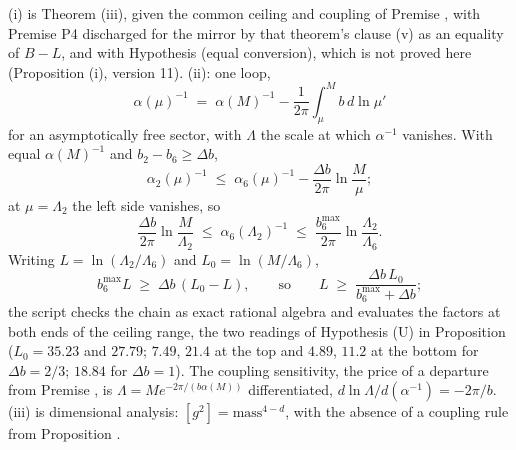 (i) is Theorem (iii), given the common ceiling and coupling of Premise , with Premise P4 discharged for the mirror by that theorem's clause (v) as an equality of $B - L$, and with Hypothesis (equal conversion), which is not proved here (Proposition (i), version 11). (ii): one loop,
\[
\alpha(\mu)^{-1} \;=\; \alpha(M)^{-1} - \frac{1}{2\pi}\int_{\mu}^{M} b\,d\ln\mu'
\]
for an asymptotically free sector, with $\Lambda$ the scale at which $\alpha^{-1}$ vanishes. With equal $\alpha(M)^{-1}$ and $b_{2} - b_{6} \geq \Delta b$,
\[
\alpha_{2}(\mu)^{-1} \;\leq\; \alpha_{6}(\mu)^{-1} - \frac{\Delta b}{2\pi}\ln\frac{M}{\mu};
\]
at $\mu = \Lambda_{2}$ the left side vanishes, so
\[
\frac{\Delta b}{2\pi}\ln\frac{M}{\Lambda_{2}} \;\leq\; \alpha_{6}(\Lambda_{2})^{-1} \;\leq\; \frac{b_{6}^{\max}}{2\pi}\ln\frac{\Lambda_{2}}{\Lambda_{6}}.
\]
Writing $L = \ln(\Lambda_{2}/\Lambda_{6})$ and $L_{0} = \ln(M/\Lambda_{6})$,
\[
b_{6}^{\max}L \;\geq\; \Delta b\,(L_{0} - L), \qquad\text{so}\qquad L \;\geq\; \frac{\Delta b\,L_{0}}{b_{6}^{\max} + \Delta b};
\]
the script checks the chain as exact rational algebra and evaluates the factors at both ends of the ceiling range, the two readings of Hypothesis (U) in Proposition  ($L_{0} = 35.23$ and $27.79$; $7.49$, $21.4$ at the top and $4.89$, $11.2$ at the bottom for $\Delta b = 2/3$; $18.84$ for $\Delta b = 1$). The coupling sensitivity, the price of a departure from Premise , is $\Lambda = M e^{-2\pi/(b\alpha(M))}$ differentiated, $d\ln\Lambda/d(\alpha^{-1}) = -2\pi/b$. (iii) is dimensional analysis: $[g^{2}] = \text{mass}^{4-d}$, with the absence of a coupling rule from Proposition .
